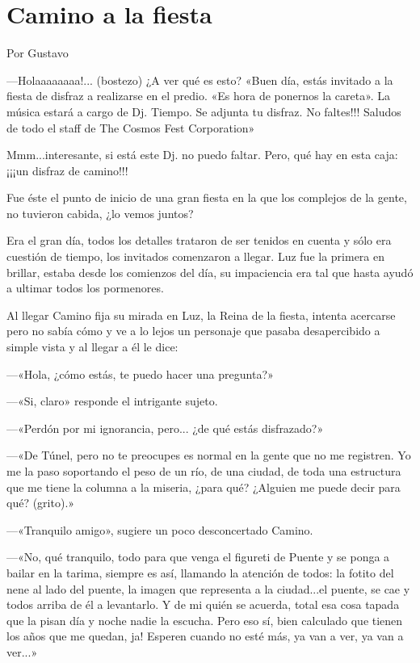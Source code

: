 \documentclass[11pt,twoside,openright,a5paper]{book}
\begin{document}
\section*{Camino a la fiesta}

\begin{flushright}Por Gustavo\end{flushright}

---Holaaaaaaaa!... (bostezo) ¿A ver qué es esto?  «Buen día, estás invitado a la fiesta de disfraz a realizarse en el predio. «Es hora de ponernos la careta». La música estará a cargo de Dj. Tiempo. Se adjunta tu disfraz. No faltes!!!  Saludos de todo el staff de The Cosmos Fest Corporation»

Mmm...interesante, si está este Dj. no puedo faltar. Pero, qué hay en esta caja: ¡¡¡un disfraz de camino!!! 

Fue éste el punto de inicio de una gran fiesta en la que los complejos de la gente, no tuvieron cabida, ¿lo vemos juntos?

Era el gran día, todos los detalles trataron de ser tenidos en cuenta y sólo era cuestión de tiempo, los invitados comenzaron a llegar. Luz fue la primera en brillar, estaba desde los comienzos del día, su impaciencia era tal que hasta ayudó a ultimar todos los pormenores.

Al llegar Camino fija su mirada en Luz, la Reina de la fiesta, intenta acercarse pero no sabía cómo y ve a lo lejos un personaje que pasaba desapercibido a simple vista y al llegar a él le dice: 

---«Hola, ¿cómo estás, te puedo hacer una pregunta?»

---«Si, claro» responde el intrigante sujeto. 

---«Perdón por mi ignorancia, pero... ¿de qué estás disfrazado?»

---«De Túnel, pero no te preocupes es normal en la gente que no me registren. Yo me la paso soportando el peso de un río, de una ciudad, de toda una estructura que me tiene la columna a la miseria, ¿para qué? ¿Alguien me puede decir para qué? (grito).»

---«Tranquilo amigo», sugiere un poco desconcertado Camino.

---«No, qué tranquilo, todo para que venga el figureti de Puente y se ponga a bailar en la tarima, siempre es así, llamando la atención de todos: la fotito del nene al lado del puente, la imagen que representa a la ciudad...el puente, se cae y todos arriba de él a levantarlo. Y de mi quién se acuerda, total esa cosa tapada que la pisan día y noche nadie la escucha. Pero eso sí, bien calculado que tienen los años que me quedan, ja! Esperen cuando no esté más, ya van a ver, ya van a ver...»
\end{document}

